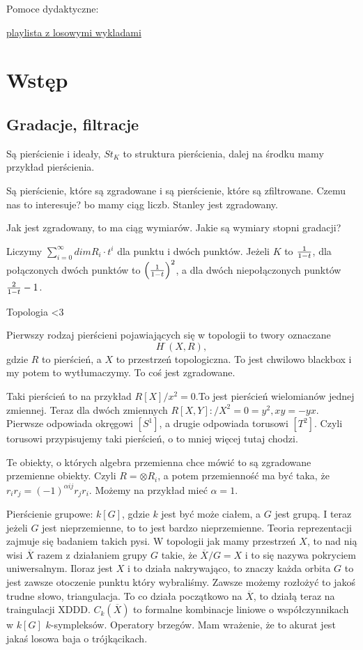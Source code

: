 Pomoce dydaktyczne:

\href{https://www.youtube.com/playlist?list=PL8yHsr3EFj53rSexSz7vsYt-3rpHPR3HB}{playlista z losowymi wykladami}

\section{Wstęp}

\subsection{Gradacje, filtracje}

Są pierścienie i ideały, $St_K$ to struktura pierścienia, dalej na środku mamy przykład pierścienia.

Są pierścienie, które są zgradowane i są pierścienie, które są zfiltrowane. Czemu nas to interesuje? bo mamy ciąg liczb. Stanley jest zgradowany.

Jak jest zgradowany, to ma ciąg wymiarów. Jakie są wymiary stopni gradacji?

Liczymy $\sum\limits_{i=0}^\infty dimR_i\cdot t^i$ dla punktu i dwóch punktów. Jeżeli $K$ to ${1\over1-t}$, dla połączonych dwóch punktów to $\left({1\over1-t}\right)^2$, a dla dwóch niepołączonych punktów ${2\over1-t}-1$.
\medskip

Topologia <3

Pierwszy rodzaj pierścieni pojawiających się w topologii to twory oznaczane
$$H^\cdot(X, R),$$
gdzie $R$ to pierścień, a $X$ to przestrzeń topologiczna. To jest chwilowo blackbox i my potem to wytłumaczymy. To coś jest zgradowane.

Taki pierścień to na przykład $R[X]/x^2=0$.To jest pierścień wielomianów jednej zmiennej. Teraz dla dwóch zmiennych $R[X, Y]:/X^2=0=y^2, xy=-yx$. Pierwsze odpowiada okręgowi $[S^1]$, a drugie odpowiada torusowi $[T^2]$. Czyli torusowi przypisujemy taki pierścień, o to mniej więcej tutaj chodzi.

Te obiekty, o których algebra przemienna chce mówić to są zgradowane przemienne obiekty. Czyli $R=\otimes R_i$, a potem przemienność ma być taka, że $r_ir_j=(-1)^{\alpha ij}r_jr_i$. Możemy na przykład mieć $\alpha=1$.

Pierścienie grupowe: $k[G]$, gdzie $k$ jest być może ciałem, a $G$ jest grupą. I teraz jeżeli $G$ jest nieprzemienne, to to jest bardzo nieprzemienne. Teoria reprezentacji zajmuje się badaniem takich pysi. W topologii jak mamy przestrzeń $X$, to nad nią wisi $\overline X$ razem z działaniem grupy $G$ takie, że $\overline X/G=X$ i to się nazywa pokryciem uniwersalnym. Iloraz jest $X$ i to działa nakrywająco, to znaczy każda orbita $G$ to jest zawsze otoczenie punktu który wybraliśmy. Zawsze możemy rozłożyć to jakoś trudne słowo, triangulacja. To co działa początkowo na $\overline X$, to działą teraz na traingulacji XDDD. $C_k(\overline X)$ to formalne kombinacje liniowe o współczynnikach w $k[G]$ $k$-sympleksów. Operatory brzegów. Mam wrażenie, że to akurat jest jakaś losowa baja o trójkącikach.